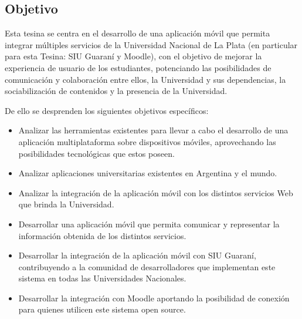 \subsection{Objetivo}
\label{objetivo}

Esta tesina se centra en el desarrollo de una aplicación móvil que permita
integrar múltiples servicios de la Universidad Nacional de La Plata (en
particular para esta Tesina: SIU Guaraní y Moodle), con el objetivo de mejorar
la experiencia de usuario de los estudiantes, potenciando las posibilidades de
comunicación y colaboración entre ellos, la Universidad y sus dependencias, la
sociabilización de contenidos y la presencia de la Universidad.

De ello se desprenden los siguientes objetivos específicos:

\begin{itemize}
  \item Analizar las herramientas existentes para llevar a cabo el desarrollo
  de una aplicación multiplataforma sobre dispositivos móviles, aprovechando las
  posibilidades tecnológicas que estos poseen.

  \item Analizar aplicaciones universitarias existentes en Argentina y el mundo.

  \item Analizar la integración de la aplicación móvil con los distintos
  servicios Web que brinda la Universidad.

  \item Desarrollar una aplicación móvil que permita comunicar y representar la
  información obtenida de los distintos servicios.

  \item Desarrollar la integración de la aplicación móvil con SIU Guaraní,
  contribuyendo a la comunidad de desarrolladores que implementan este sistema en todas las Universidades Nacionales.

  \item Desarrollar la integración con Moodle aportando la posibilidad de
  conexión para quienes utilicen este sistema open source.
\end{itemize}
